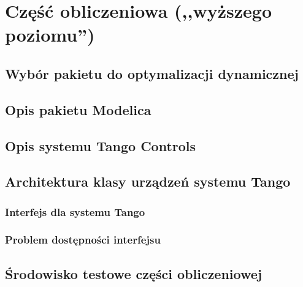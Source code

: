 \section{Część obliczeniowa (,,wyższego poziomu'')}
\label{sec:czesc-wyzsza}


\subsection{Wybór pakietu do optymalizacji dynamicznej}
\label{sub:czesc-wyzsza-wybor}


\subsection{Opis pakietu Modelica}
\label{sub:czesc-wyzsza-modelica}


\subsection{Opis systemu Tango Controls}
\label{sub:czesc-wyzsza-tango}


\subsection{Architektura klasy urządzeń systemu Tango}
\label{sub:czesc-wyzsza-klasa}


\subsubsection{Interfejs dla systemu Tango}


\subsubsection{Problem dostępności interfejsu}


\subsection{Środowisko testowe części obliczeniowej}
\label{sub:czesc-wyzsza-docker}